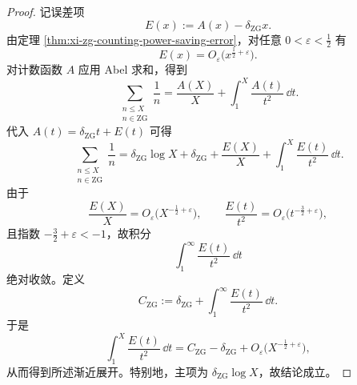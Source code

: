 \begin{proof}
记误差项
\[
E(x):=A(x)-\delta_{\mathrm{ZG}}x.
\]
由定理 \ref{thm:xi-zg-counting-power-saving-error}，对任意 \(0<\varepsilon<\tfrac12\) 有
\[
E(x)=O_\varepsilon\!\bigl(x^{\frac12+\varepsilon}\bigr).
\]
对计数函数 \(A\) 应用 Abel 求和，得到
\[
\sum_{\substack{n\le X\\ n\in\mathrm{ZG}}}\frac{1}{n}
=\frac{A(X)}{X}+\int_{1}^{X}\frac{A(t)}{t^{2}}\,\dd t.
\]
代入 \(A(t)=\delta_{\mathrm{ZG}}t+E(t)\) 可得
\[
\sum_{\substack{n\le X\\ n\in\mathrm{ZG}}}\frac{1}{n}
=\delta_{\mathrm{ZG}}\log X+\delta_{\mathrm{ZG}}
+\frac{E(X)}{X}
+\int_{1}^{X}\frac{E(t)}{t^{2}}\,\dd t.
\]
由于
\[
\frac{E(X)}{X}=O_\varepsilon\!\bigl(X^{-\frac12+\varepsilon}\bigr),
\qquad
\frac{E(t)}{t^{2}}=O_\varepsilon\!\bigl(t^{-\frac32+\varepsilon}\bigr),
\]
且指数 \(-\tfrac32+\varepsilon<-1\)，故积分
\[
\int_{1}^{\infty}\frac{E(t)}{t^{2}}\,\dd t
\]
绝对收敛。定义
\[
C_{\mathrm{ZG}}
:=\delta_{\mathrm{ZG}}+\int_{1}^{\infty}\frac{E(t)}{t^{2}}\,\dd t.
\]
于是
\[
\int_{1}^{X}\frac{E(t)}{t^{2}}\,\dd t
=C_{\mathrm{ZG}}-\delta_{\mathrm{ZG}}+O_\varepsilon\!\bigl(X^{-\frac12+\varepsilon}\bigr),
\]
从而得到所述渐近展开。特别地，主项为 \(\delta_{\mathrm{ZG}}\log X\)，故结论成立。
\end{proof}
